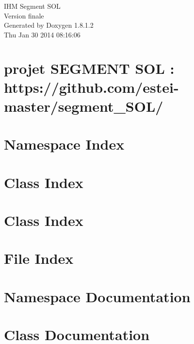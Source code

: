 \documentclass{book}
\begin{document}
\hypersetup{pageanchor=false,citecolor=blue}
\begin{titlepage}
\vspace*{7cm}
\begin{center}
{\Large I\-H\-M Segment S\-O\-L \\[1ex]\large Version finale }\\
\vspace*{1cm}
{\large Generated by Doxygen 1.8.1.2}\\
\vspace*{0.5cm}
{\small Thu Jan 30 2014 08:16:06}\\
\end{center}
\end{titlepage}
\clearemptydoublepage
{}
\tableofcontents
\clearemptydoublepage
{}
\hypersetup{pageanchor=true,citecolor=blue}
\chapter{projet S\-E\-G\-M\-E\-N\-T S\-O\-L \-: https\-://github.com/estei-\/master/segment\-\_\-\-S\-O\-L/}
\label{index}\hypertarget{index}{}
\chapter{Namespace Index}

\chapter{Class Index}

\chapter{Class Index}

\chapter{File Index}

\chapter{Namespace Documentation}

\chapter{Class Documentation}




















\end{document}
